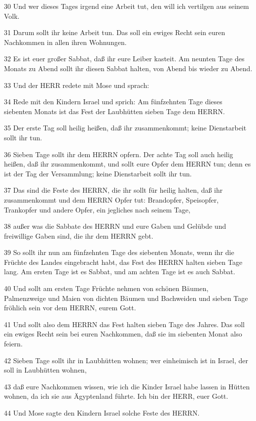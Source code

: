 \par 30 Und wer dieses Tages irgend eine Arbeit tut, den will ich vertilgen aus seinem Volk.
\par 31 Darum sollt ihr keine Arbeit tun. Das soll ein ewiges Recht sein euren Nachkommen in allen ihren Wohnungen.
\par 32 Es ist euer großer Sabbat, daß ihr eure Leiber kasteit. Am neunten Tage des Monats zu Abend sollt ihr diesen Sabbat halten, von Abend bis wieder zu Abend.
\par 33 Und der HERR redete mit Mose und sprach:
\par 34 Rede mit den Kindern Israel und sprich: Am fünfzehnten Tage dieses siebenten Monats ist das Fest der Laubhütten sieben Tage dem HERRN.
\par 35 Der erste Tag soll heilig heißen, daß ihr zusammenkommt; keine Dienstarbeit sollt ihr tun.
\par 36 Sieben Tage sollt ihr dem HERRN opfern. Der achte Tag soll auch heilig heißen, daß ihr zusammenkommt, und sollt eure Opfer dem HERRN tun; denn es ist der Tag der Versammlung; keine Dienstarbeit sollt ihr tun.
\par 37 Das sind die Feste des HERRN, die ihr sollt für heilig halten, daß ihr zusammenkommt und dem HERRN Opfer tut: Brandopfer, Speisopfer, Trankopfer und andere Opfer, ein jegliches nach seinem Tage,
\par 38 außer was die Sabbate des HERRN und eure Gaben und Gelübde und freiwillige Gaben sind, die ihr dem HERRN gebt.
\par 39 So sollt ihr nun am fünfzehnten Tage des siebenten Monats, wenn ihr die Früchte des Landes eingebracht habt, das Fest des HERRN halten sieben Tage lang. Am ersten Tage ist es Sabbat, und am achten Tage ist es auch Sabbat.
\par 40 Und sollt am ersten Tage Früchte nehmen von schönen Bäumen, Palmenzweige und Maien von dichten Bäumen und Bachweiden und sieben Tage fröhlich sein vor dem HERRN, eurem Gott.
\par 41 Und sollt also dem HERRN das Fest halten sieben Tage des Jahres. Das soll ein ewiges Recht sein bei euren Nachkommen, daß sie im siebenten Monat also feiern.
\par 42 Sieben Tage sollt ihr in Laubhütten wohnen; wer einheimisch ist in Israel, der soll in Laubhütten wohnen,
\par 43 daß eure Nachkommen wissen, wie ich die Kinder Israel habe lassen in Hütten wohnen, da ich sie aus Ägyptenland führte. Ich bin der HERR, euer Gott.
\par 44 Und Mose sagte den Kindern Israel solche Feste des HERRN.

